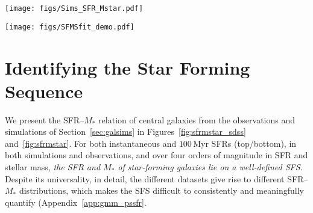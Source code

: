 \documentclass[tighten, preprint]{aastex62}
\begin{document}
\begin{figure*}
\begin{center}
\texttt{[image: figs/Sims\_SFR\_Mstar.pdf]} 
\caption{\color{red} The SFR--$M_*$ relations of central galaxies from 
the Illustris (green), EAGLE (red), and {\sc Mufasa} (purple) hydrodyamic 
simulations and the SC-SAM (brown). The top panels use instantaneous SFRs while the 
bottom panels use SFRs averaged over $100\,\mathrm{Myr}$. We describe 
the simulations and how we derive consistent SFRs and $M_*$s in 
Section~\ref{sec:galsims}. \emph{The SFR--$M_*$ relations reveal star 
forming sequences in all of the simulations.}} 
\label{fig:sfrmstar}
\end{center}
\end{figure*}
\begin{figure*}
\begin{center}
\texttt{[image: figs/SFMSfit\_demo.pdf]} 
\caption{
We illustrate our 
{\color{red} GMM based method for identifying the SFS of} Illustris central galaxies in two 
stellar mass bins highlighted on the SFR--$M_*$ relation of the left panel: 
$10.4 < \log\,M_* < 10.6$ and $11.0 < \log\,M_* < 11.2$. We compare the SSFR 
distributions, $p(\log\,\mathrm{SSFR})$, in the two stellar mass bins to their 
best-fit GMMs (right panels). The $p(\log\,\mathrm{SSFR})$ in the center panel is best described by a 
GMM with three components (orange, green, and blue) while the
$p(\log\,\mathrm{SSFR})$ in the right panel is best described by 
a GMM with two components (orange and blue). The SFS components of the 
best-fit GMMs are plotted in blue. \emph{Our GMM method provides
a flexible and data-driven method of identifying the SFS in a wide variety 
of SSFR distributions without hard assumptions or cuts to the sample.}
}\label{fig:fitdemo}
\end{center}
\end{figure*}

\section{Identifying the Star Forming Sequence}\label{sec:sfmsfit}
We present the SFR--$M_*$ relation of central galaxies from the 
observations and simulations of Section~\ref{sec:galsims} in 
Figures~\ref{fig:sfrmstar_sdss} and~\ref{fig:sfrmstar}. For both 
instantaneous and $100\,\mathrm{Myr}$ SFRs (top/bottom),
in both simulations and observations, and over four orders of magnitude 
in SFR and stellar mass, \emph{the SFR and $M_*$ of star-forming galaxies 
lie on a well-defined SFS.} 
{\color{red} Despite its universality, in detail, the different 
datasets give rise to different SFR--$M_*$ distributions, which makes the 
SFS difficult to consistently and meaningfully quantify (Appendix~\ref{app:gmm_pssfr}.} 
\end{document}
